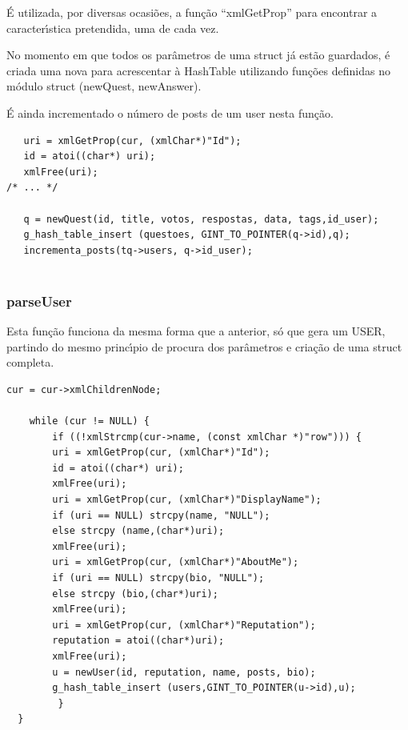 \documentclass{article}
\begin{document}
\par \'{E} utilizada, por diversas ocasi\~{o}es, a fun\c{c}\~{a}o \textquotedblleft{}xmlGetProp\textquotedblright{} para encontrar a caracter\'{\i}stica pretendida, uma de cada vez.

\par No momento em que todos os par\^{a}metros de uma struct j\'{a} est\~{a}o guardados, \'{e} criada uma nova para acrescentar \`{a} HashTable utilizando fun\c{c}\~{o}es definidas no m\'{o}dulo struct (newQuest, newAnswer). 

\par \'{E} ainda incrementado o n\'{u}mero de posts de um user nesta fun\c{c}\~{a}o.

\begin{lstlisting}
   uri = xmlGetProp(cur, (xmlChar*)"Id");
   id = atoi((char*) uri);
   xmlFree(uri);
/* ... */

   q = newQuest(id, title, votos, respostas, data, tags,id_user);
   g_hash_table_insert (questoes, GINT_TO_POINTER(q->id),q); 
   incrementa_posts(tq->users, q->id_user);
	    
\end{lstlisting}

\subsubsection{parseUser}
\par Esta fun\c{c}\~{a}o funciona da mesma forma que a anterior, s\'{o} que gera um USER, partindo do mesmo princ\'{\i}pio de procura dos par\^{a}metros e cria\c{c}\~{a}o de uma struct completa.   

\begin{lstlisting}
cur = cur->xmlChildrenNode;
    
    while (cur != NULL) {
        if ((!xmlStrcmp(cur->name, (const xmlChar *)"row"))) {
	    uri = xmlGetProp(cur, (xmlChar*)"Id");
	    id = atoi((char*) uri);
	    xmlFree(uri);
	    uri = xmlGetProp(cur, (xmlChar*)"DisplayName");
	    if (uri == NULL) strcpy(name, "NULL");
	    else strcpy (name,(char*)uri);
	    xmlFree(uri); 
	    uri = xmlGetProp(cur, (xmlChar*)"AboutMe");
	    if (uri == NULL) strcpy(bio, "NULL"); 
	    else strcpy (bio,(char*)uri);
	    xmlFree(uri);
	    uri = xmlGetProp(cur, (xmlChar*)"Reputation");
	    reputation = atoi((char*)uri);
	    xmlFree(uri);
	    u = newUser(id, reputation, name, posts, bio);
    	g_hash_table_insert (users,GINT_TO_POINTER(u->id),u); 	
         }
  }
\end{lstlisting}
\end{document}
